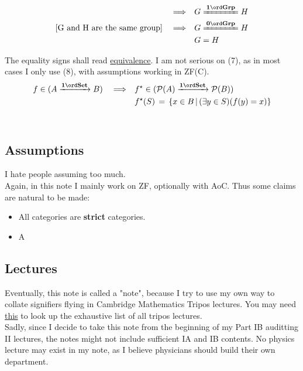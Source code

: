 \begin{align}
  [\text{G and H are isomorphic in groups}] \corres & G\iso{Grp} H \\
  [\text{G and H are the same group}] \corres & G\iso[0]{Grp} H \\
                                                    & G = H
\end{align} 

The equality signs shall read \href{https://ncatlab.org/nlab/show/equivalence}{equivalence}. I am not serious on (7), as in most cases I only use (8), with assumptions working in ZF(C). \\

\begin{align}
  f\in (A\func B) \quad \Longrightarrow \quad & f^{\star}\in (\mathcal{P}(A) \func \mathcal{P}(B)) \\
                                                                           & f^{\star}(S)\,=\, \{x\in B \,|\, (\exists y\in S)(f(y)=x) \}
\end{align} \\

\subsection{Assumptions}

I hate people assuming too much. \\

Again, in this note I mainly work on ZF, optionally with AoC. Thus some claims are natural to be made:
\begin{itemize}
  \item All categories are \textbf{strict} categories.
  \item A
\end{itemize}

\subsection{Lectures}

Eventually, this note is called a "note", because I try to use my own way to collate signifiers flying in Cambridge Mathematics Tripos lectures. You may need \href{https://www.maths.cam.ac.uk/undergrad/files/lecturelist/current/All_Parts.pdf}{this} to look up the exhaustive list of all tripos lectures. \\

Sadly, since I decide to take this note from the beginning of my Part IB auditting II lectures, the notes might not include sufficient IA and IB contents. No physics lecture may exist in my note, as I believe physicians should build their own department.\\

